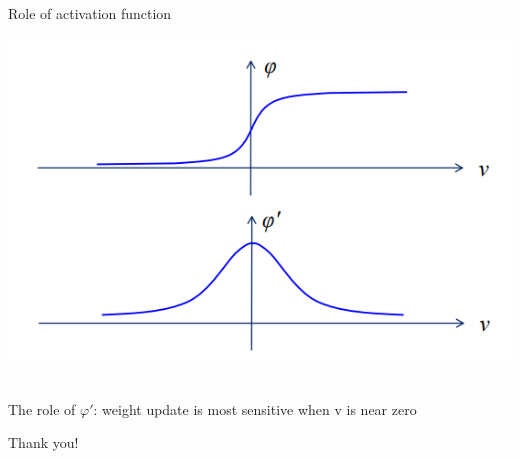 \documentclass[notes]{beamer}
\newcommand{\chuhao}{\fontsize{44.9pt}{\baselineskip}\selectfont}
\begin{document}
\begin{frame}{Role of activation function}

\centering 

\includegraphics[width=1.00000\textwidth]{2018-03-10-10-41-52.png} ~

The role of \(\varphi'\): weight update is most sensitive when v is near
zero

\end{frame}

\begin{frame}
	\chuhao Thank you! %
\end{frame}
\end{document}
